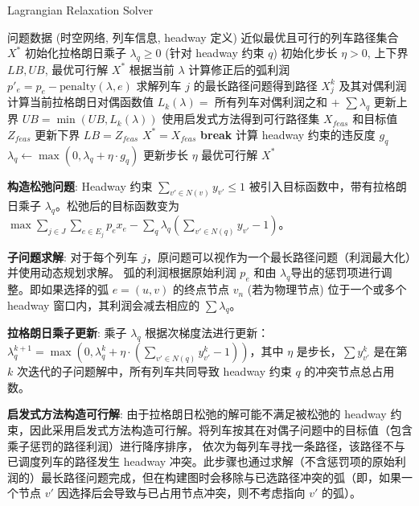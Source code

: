 \documentclass{article}
\begin{document}
\begin{algorithm}[h]
    \caption{Lagrangian Relaxation Solver}
    \begin{algorithmic}[1]
        \Require 问题数据 (时空网络, 列车信息, headway 定义)
        \Ensure 近似最优且可行的列车路径集合 $X^*$
        \State 初始化拉格朗日乘子 $\lambda_q \ge 0$ (针对 headway 约束 $q$)
        \State 初始化步长 $\eta > 0$, 上下界 $LB, UB$, 最优可行解 $X^*$
        \State 根据当前 $\lambda$ 计算修正后的弧利润 $p'_e = p_e -
        \text{penalty}(\lambda, e)$
        \State 求解列车 $j$ 的最长路径问题得到路径 $X^k_j$ 及其对偶利润
        \EndFor
        \State 计算当前拉格朗日对偶函数值 $L_k(\lambda) = $ 所有列车对偶利润之和 + $\sum \lambda_q$
        \State 更新上界 $UB = \min(UB, L_k(\lambda))$
        \State 使用启发式方法得到可行路径集 $X_{feas}$
        和目标值 $Z_{feas}$
        \State 更新下界 $LB = Z_{feas}$
        \State $X^* = X_{feas}$
        \EndIf
        \State \textbf{break}
        \EndIf
        \State 计算 headway 约束的违反度 $g_q$
        \State $\lambda_q \gets \max(0, \lambda_q + \eta \cdot g_q)$
        \State 更新步长 $\eta$
        \EndFor
        \State \Return 最优可行解 $X^*$
    \end{algorithmic}\label{alg:lagrangian_relaxation}
\end{algorithm}

\textbf{构造松弛问题}:
Headway 约束 $\sum_{v' \in N(v)} y_{v'} \le 1$
被引入目标函数中，带有拉格朗日乘子 $\lambda_q$。松弛后的目标函数变为 $\max
\sum_{j \in J} \sum_{e \in E_j} p_e x_e - \sum_q \lambda_q
(\sum_{v' \in N(q)} y_{v'} - 1)$。

\textbf{子问题求解}:
对于每个列车 $j$，原问题可以视作为一个最长路径问题（利润最大化）并使用动态规划求解。 弧的利润根据原始利润 $p_e$ 和由
$\lambda_q$导出的惩罚项进行调整。即如果选择的弧 $e=(u,v)$ 的终点节点 $v_n$ (若为物理节点)
位于一个或多个 headway 窗口内，其利润会减去相应的 $\sum \lambda_q$。

\textbf{拉格朗日乘子更新}:
乘子 $\lambda_q$ 根据次梯度法进行更新： $\lambda_q^{k+1} =
\max(0, \lambda_q^k + \eta \cdot (\sum_{v' \in N(q)}
y_{v'}^{k} - 1))$，其中 $\eta$ 是步长，$\sum
y_{v'}^{k}$ 是在第 $k$ 次迭代的子问题解中，所有列车共同导致 headway 约束 $q$
的冲突节点总占用数。

\textbf{启发式方法构造可行解}:
由于拉格朗日松弛的解可能不满足被松弛的 headway
约束，因此采用启发式方法构造可行解。将列车按其在对偶子问题中的目标值（包含乘子惩罚的路径利润）进行降序排序，
依次为每列车寻找一条路径，该路径不与已调度列车的路径发生 headway
冲突。此步骤也通过求解（不含惩罚项的原始利润的）最长路径问题完成，但在构建图时会移除与已选路径冲突的弧（即，如果一个节点
$v'$ 因选择后会导致与已占用节点冲突，则不考虑指向 $v'$ 的弧）。
\end{document}
